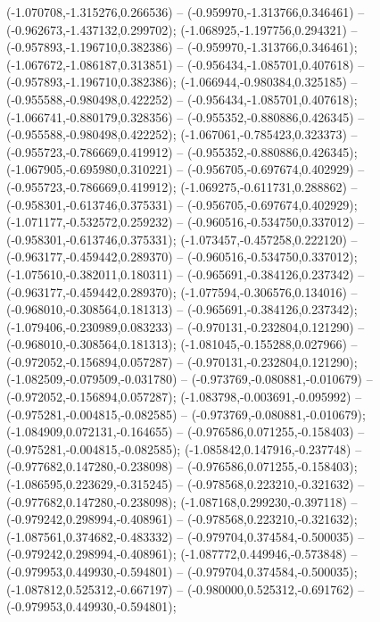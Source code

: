  (-1.070708,-1.315276,0.266536) -- (-0.959970,-1.313766,0.346461) -- (-0.962673,-1.437132,0.299702);
 (-1.068925,-1.197756,0.294321) -- (-0.957893,-1.196710,0.382386) -- (-0.959970,-1.313766,0.346461);
 (-1.067672,-1.086187,0.313851) -- (-0.956434,-1.085701,0.407618) -- (-0.957893,-1.196710,0.382386);
 (-1.066944,-0.980384,0.325185) -- (-0.955588,-0.980498,0.422252) -- (-0.956434,-1.085701,0.407618);
 (-1.066741,-0.880179,0.328356) -- (-0.955352,-0.880886,0.426345) -- (-0.955588,-0.980498,0.422252);
 (-1.067061,-0.785423,0.323373) -- (-0.955723,-0.786669,0.419912) -- (-0.955352,-0.880886,0.426345);
 (-1.067905,-0.695980,0.310221) -- (-0.956705,-0.697674,0.402929) -- (-0.955723,-0.786669,0.419912);
 (-1.069275,-0.611731,0.288862) -- (-0.958301,-0.613746,0.375331) -- (-0.956705,-0.697674,0.402929);
 (-1.071177,-0.532572,0.259232) -- (-0.960516,-0.534750,0.337012) -- (-0.958301,-0.613746,0.375331);
 (-1.073457,-0.457258,0.222120) -- (-0.963177,-0.459442,0.289370) -- (-0.960516,-0.534750,0.337012);
 (-1.075610,-0.382011,0.180311) -- (-0.965691,-0.384126,0.237342) -- (-0.963177,-0.459442,0.289370);
 (-1.077594,-0.306576,0.134016) -- (-0.968010,-0.308564,0.181313) -- (-0.965691,-0.384126,0.237342);
 (-1.079406,-0.230989,0.083233) -- (-0.970131,-0.232804,0.121290) -- (-0.968010,-0.308564,0.181313);
 (-1.081045,-0.155288,0.027966) -- (-0.972052,-0.156894,0.057287) -- (-0.970131,-0.232804,0.121290);
 (-1.082509,-0.079509,-0.031780) -- (-0.973769,-0.080881,-0.010679) -- (-0.972052,-0.156894,0.057287);
 (-1.083798,-0.003691,-0.095992) -- (-0.975281,-0.004815,-0.082585) -- (-0.973769,-0.080881,-0.010679);
 (-1.084909,0.072131,-0.164655) -- (-0.976586,0.071255,-0.158403) -- (-0.975281,-0.004815,-0.082585);
 (-1.085842,0.147916,-0.237748) -- (-0.977682,0.147280,-0.238098) -- (-0.976586,0.071255,-0.158403);
 (-1.086595,0.223629,-0.315245) -- (-0.978568,0.223210,-0.321632) -- (-0.977682,0.147280,-0.238098);
 (-1.087168,0.299230,-0.397118) -- (-0.979242,0.298994,-0.408961) -- (-0.978568,0.223210,-0.321632);
 (-1.087561,0.374682,-0.483332) -- (-0.979704,0.374584,-0.500035) -- (-0.979242,0.298994,-0.408961);
 (-1.087772,0.449946,-0.573848) -- (-0.979953,0.449930,-0.594801) -- (-0.979704,0.374584,-0.500035);
 (-1.087812,0.525312,-0.667197) -- (-0.980000,0.525312,-0.691762) -- (-0.979953,0.449930,-0.594801);
